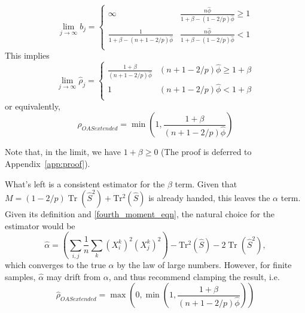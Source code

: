 \documentclass[10pt,twoside,titlepage]{article}   %
\begin{document}
\begin{equation}
  \lim_{j \to \infty} b_j =
    \begin{cases}
      \infty & \frac{  n \hat{\phi} }{ 1 + \beta - (1-2/p) \hat{\phi} } \geq  1 \\
      \frac{1}{1 + \beta - (n+1-2/p) \hat{\phi} }      & \frac{  n \hat{\phi} }{ 1 + \beta - (1-2/p) \hat{\phi} } < 1 \\
    \end{cases}
\end{equation}
This implies 
\begin{equation}
  \lim_{j \to \infty} \hat{\rho}_j =
    \begin{cases}
      \frac{ 1 + \beta }{ (n+1-2/p) \hat{\phi} } & (n+1-2/p) \hat{\phi} \geq 1 + \beta \\
      1                                          & (n+1-2/p) \hat{\phi} < 1 + \beta \\
    \end{cases}
\end{equation}
or equivalently, 
\begin{equation}
\label{new_OAS}
\rho_{OAS extended} = \operatorname{min}\left( 1, \frac{ 1 + \beta }{ (n+1-2/p) \hat{\phi} } \right)
\end{equation}

Note that, in the limit, we have $1 + \beta \geq 0$  (The proof is deferred to Appendix~\ref{app:proof}).

What's left is a consistent estimator for the $\beta$ term.
Given that $M = (1-2/p) \operatorname{Tr}( \hat{S}^2 ) + \operatorname{Tr^2}( \hat{S} )$ is already handed, this leaves the $\alpha$ term.
Given its definition and \eqref{fourth_moment_eqn}, the natural choice for the estimator would be
\begin{equation}
\hat{\alpha} = \left( \sum_{i,j} \frac{1}{n} \sum_k (X_i^k)^2 (X_j^k)^2 \right) - \operatorname{Tr^2}(\hat{S}) - 2 \operatorname{Tr}(\hat{S}^2),
\end{equation}
which converges to the true $\alpha$ by the law of large numbers.
However, for finite samples, $\hat{\alpha}$ may drift from $\alpha$, and thus recommend clamping the result, i.e.
\begin{equation}
\hat{\rho}_{OAS extended} = \operatorname{max} \left( 0, \operatorname{min}\left( 1, \frac{ 1 + \beta }{ (n+1-2/p) \hat{\phi} } \right) \right)
\end{equation}

\clearpage

\appendix
\end{document}
